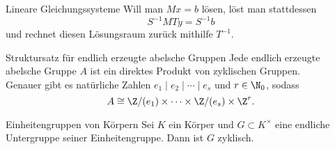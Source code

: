 \begin{karte}{Lineare Gleichungssysteme}
    Will man \(Mx = b\) lösen, löst man stattdessen 
    \[ S^{-1} M T y = S^{-1} b \]
    und rechnet diesen Lösungsraum zurück mithilfe \(T^{-1}\).
\end{karte}

\begin{karte}{Struktursatz für endlich erzeugte abelsche Gruppen}
    Jede endlich erzeugte abelsche Gruppe \(A\) ist ein direktes Produkt 
    von zyklischen Gruppen. \\
    Genauer gibt es natürliche Zahlen \(e_1 \;|\; e_2 \;|\; \cdots \;|\; e_s\) 
    und \(r\in \N_0\), sodass 
    \[ A \cong \Z/(e_1) \times \cdots \times \Z/(e_s) \times \Z^r. \]
\end{karte}

\begin{karte}{Einheitengruppen von Körpern}
    Sei \(K\) ein Körper und \(G\subset K^\times \) eine endliche 
    Untergruppe seiner Einheitengruppe. Dann ist \(G\) zyklisch.
\end{karte}